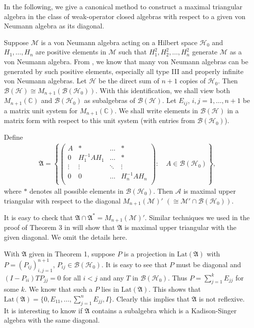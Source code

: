 \documentclass{pnastwo}
\newenvironment{proof}[1][Proof]{\begin{trivlist}
\item[\hskip \labelsep {\bfseries #1}]}{\end{trivlist}}
\newcommand{\A}{\mathcal A}
\newcommand{\AAA}{\mathfrak A}
\newcommand{\B}{\mathcal B}
\newcommand{\HHH}{\mathcal H} %
\newcommand{\M}{\mathcal M}
\newcommand{\Lat}{\mathrm{Lat}}
\newcommand{\C}{\mathbb C} %
\begin{document}
\begin{article}
In the following, we give a canonical method to construct a maximal
triangular algebra in the class of weak-operator closed algebras
with respect to a given von Neumann algebra as its diagonal.

Suppose $\M$ is a von Neumann algebra acting on a Hilbert space
$\HHH_0$ and $H_1,\ldots,H_n$ are positive elements in $\M$ such
that $H_1^2,H_2^2,\ldots, H_n^2$ generate $\M$ as a von Neumann
algebra. From \cite{GS}, we know that many von Neumann algebras can be
generated by such positive elements, especially all type III and
properly infinite von Neumann algebras. Let $\HHH$ be the direct sum
of $n+1$ copies of $\HHH_0$. Then $\B(\HHH)\cong M_{n+1}(\B(\HHH_0))$.
With this identification, we shall view both $M_{n+1}(\C)$ and
$\B(\HHH_0)$ as subalgebras of $\B(\HHH)$. Let $E_{ij}$,
$i,j=1,\ldots,n+1$ be a matrix unit system for $M_{n+1}(\C)$. We
shall write elements in $\B(\HHH)$ in a matrix form with respect to
this unit system (with entries from $\B(\HHH_0)$).

\begin{theorem}
Define
\begin{align*}
\AAA= \left\{ \left( \begin{array}{cccc}
                 A & * &  \ldots & * \\
                 0 & H_1^{-1} A H_1 & \ldots & * \\
                 \vdots & \vdots & \ddots & \vdots\\
                 0 & 0 & \ldots & H_n^{-1} A H_n \\
                 \end{array}
     \right) :\quad  A \in \B(\HHH_0) \right\},
\end{align*}
where $*$ denotes all possible elements in $\B(\HHH_0)$. Then $\A$
is maximal upper triangular with respect to the diagonal
$M_{n+1}(\M)'$ $(\cong \M'\cap\B(\HHH_0))$.
\end{theorem}

\begin{proof}
It is easy to check that $\AAA\cap
\AAA^*= M_{n+1}(\M)'$. Similar techniques we used in the proof of
Theorem 3 in \cite{GY} will show that $\AAA$ is maximal upper
triangular with the given diagonal. We omit the details
here.
\end{proof}

With $\AAA$ given in Theorem 1, suppose $P$ is a projection in
$\Lat(\AAA)$ with $P=(P_{ij})_{i,j=1}^{n+1}$, $P_{ij}\in\B(\HHH_0)$.
It is easy to see that $P$ must be diagonal and
$(I-P_{ii})TP_{jj}=0$ for all $i<j$ and any $T$ in $\B(\HHH_0)$.
Thus $P=\sum_{j=1}^k E_{jj}$ for some $k$. We know that such a $P$
lies in $\Lat(\AAA)$. This shows that $\Lat(\AAA)=\{0, E_{11},\ldots,
\sum_{j=1}^{n}E_{jj}, I\}$. Clearly this implies that $\AAA$ is not
reflexive. It is interesting to know if $\AAA$ contains a subalgebra
which is a Kadison-Singer algebra with the same diagonal.


\end{article}
\end{document}
